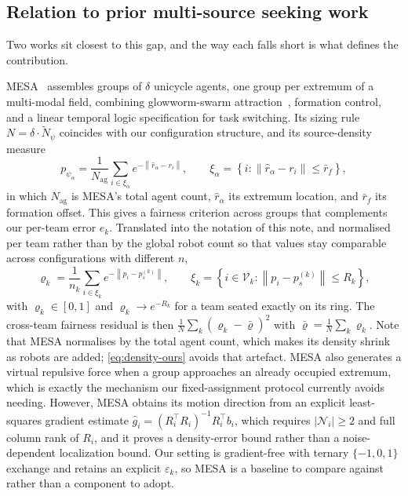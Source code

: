 \documentclass[11pt]{article}
\newcommand{\V}{\mathcal{V}}
\newcommand{\N}{\mathcal{N}}
\newcommand{\norm}[1]{\left\lVert #1\right\rVert}
\newcommand{\NotationContext}[1]{\markboth{#1}{#1}}
\begin{document}
\subsection{Relation to prior multi-source seeking work}\label{sec:gap1-related}
\NotationContext{related}

Two works sit closest to this gap, and the way each falls short is what defines the contribution.

MESA~\cite{turgeman2018} assembles groups of $\delta$ unicycle agents, one group per extremum of a multi-modal field, combining glowworm-swarm attraction~\cite{krishnanand2009}, formation control, and a linear temporal logic specification for task switching. Its sizing rule $N=\delta\cdot\tilde N_\psi$ coincides with our configuration structure, and its source-density measure
\begin{equation}\label{eq:density}
    p_{\psi_\alpha}=\frac{1}{N_{\mathrm{ag}}}\sum_{i\in\xi_\alpha}e^{-\norm{\hat r_\alpha-r_i}},
    \qquad
    \xi_\alpha=\left\{i:\norm{\hat r_\alpha-r_i}\leq\bar r_f\right\},
\end{equation}
in which $N_{\mathrm{ag}}$ is MESA's total agent count, $\hat r_\alpha$ its extremum location, and $\bar r_f$ its formation offset. This
gives a fairness criterion across groups that complements our per-team error $e_k$. Translated into the notation of this note, and normalised per team rather than by the global robot count so that values stay comparable across configurations with different $n$,
\begin{equation}\label{eq:density-ours}
    \varrho_k=\frac{1}{n_k}\sum_{i\in\xi_k}e^{-\norm{p_i-p_s^{(k)}}},
    \qquad
    \xi_k=\left\{i\in\V_k:\norm{p_i-p_s^{(k)}}\leq R_k\right\},
\end{equation}
with $\varrho_k\in[0,1]$ and $\varrho_k\to e^{-R_k}$ for a team seated exactly on its ring. The cross-team fairness residual is then $\frac{1}{N}\sum_{k}(\varrho_k-\bar\varrho)^2$ with $\bar\varrho=\frac1N\sum_k\varrho_k$. Note that MESA normalises by the total agent count, which makes its density shrink as robots are added; \eqref{eq:density-ours} avoids that artefact. MESA also generates a virtual repulsive force when a group approaches an already occupied extremum, which is exactly the mechanism our fixed-assignment protocol currently avoids needing. However, MESA obtains its motion direction from an explicit least-squares gradient estimate $\hat g_i=(R_i^{\!\top}R_i)^{-1}R_i^{\!\top}b_i$, which requires $\lvert\N_i\rvert\geq2$ and full column rank of $R_i$, and it proves a density-error bound rather than a noise-dependent localization bound. Our setting is gradient-free with ternary $\{-1,0,1\}$ exchange and retains an explicit $\varepsilon_k$, so MESA is a baseline to compare against rather than a component to adopt.
\end{document}
